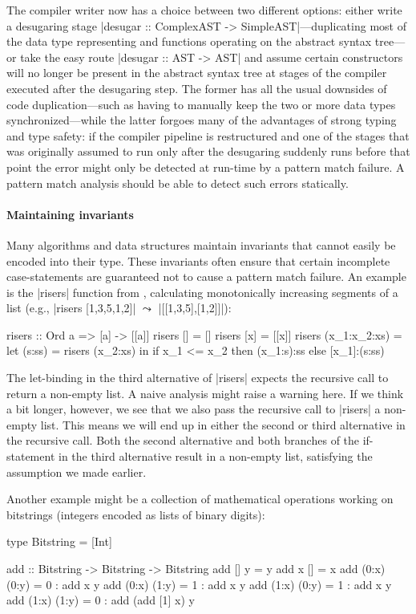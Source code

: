 The compiler writer now has a choice between two different options: either write a desugaring stage |desugar :: ComplexAST -> SimpleAST|---duplicating most of the data type representing and functions operating on the abstract syntax tree---or take the easy route |desugar :: AST -> AST| and assume certain constructors will no longer be present in the abstract syntax tree at stages of the compiler executed after the desugaring step. The former has all the usual downsides of code duplication---such as having to manually keep the two or more data types synchronized---while the latter forgoes many of the advantages of strong typing and type safety: if the compiler pipeline is restructured and one of the stages that was originally assumed to run only after the desugaring suddenly runs before that point the error might only be detected at run-time by a pattern match failure. A pattern match analysis should be able to detect such errors statically.

\paragraph{Maintaining invariants}
Many algorithms and data structures maintain invariants that cannot easily be encoded into their type. These invariants often ensure that certain incomplete case-statements are guaranteed not to cause a pattern match failure. An example is the |risers| function from \cite{DBLP:conf/sfp/MitchellR05}, calculating monotonically increasing segments of a list (e.g., |risers [1,3,5,1,2]| $\leadsto$ |[[1,3,5],[1,2]]|):

\begin{code}
risers :: Ord a => [a] -> [[a]]
risers []            =  []
risers [x]           =  [[x]]
risers (x_1:x_2:xs)  =  let (s:ss) = risers (x_2:xs)
                        in if x_1 <= x_2 then (x_1:s):ss else  [x_1]:(s:ss)
\end{code}

The let-binding in the third alternative of |risers| expects the recursive call to return a non-empty list. A naive analysis might raise a warning here. If we think a bit longer, however, we see that we also pass the recursive call to |risers| a non-empty list. This means we will end up in either the second or third alternative in the recursive call. Both the second alternative and both branches of the if-statement in the third alternative result in a non-empty list, satisfying the assumption we made earlier.

Another example might be a collection of mathematical operations working on bitstrings (integers encoded as lists of binary digits):
\begin{code}
type Bitstring = [Int]

add :: Bitstring -> Bitstring -> Bitstring
add []      y      = y
add x       []     = x
add (0:x)   (0:y)  = 0 : add x y
add (0:x)   (1:y)  = 1 : add x y
add (1:x)   (0:y)  = 1 : add x y
add (1:x)   (1:y)  = 0 : add (add [1] x) y
\end{code}

